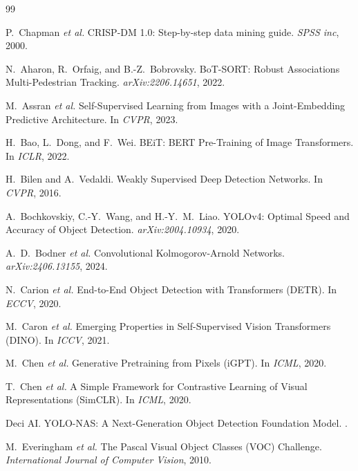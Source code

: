 
\begin{thebibliography}{99}

P.~Chapman \textit{et al.}
\newblock CRISP-DM 1.0: Step-by-step data mining guide.
\newblock \textit{SPSS inc}, 2000.

N.~Aharon, R.~Orfaig, and B.-Z.~Bobrovsky.
\newblock BoT-SORT: Robust Associations Multi-Pedestrian Tracking.
\newblock \textit{arXiv:2206.14651}, 2022.

M.~Assran \textit{et al.}
\newblock Self-Supervised Learning from Images with a Joint-Embedding Predictive Architecture.
\newblock In \textit{CVPR}, 2023.

H.~Bao, L.~Dong, and F.~Wei.
\newblock BEiT: BERT Pre-Training of Image Transformers.
\newblock In \textit{ICLR}, 2022.

H.~Bilen and A.~Vedaldi.
\newblock Weakly Supervised Deep Detection Networks.
\newblock In \textit{CVPR}, 2016.

A.~Bochkovskiy, C.-Y.~Wang, and H.-Y.~M.~Liao.
\newblock YOLOv4: Optimal Speed and Accuracy of Object Detection.
\newblock \textit{arXiv:2004.10934}, 2020.

A.~D.~Bodner \textit{et al.}
\newblock Convolutional Kolmogorov-Arnold Networks.
\newblock \textit{arXiv:2406.13155}, 2024.

N.~Carion \textit{et al.}
\newblock End-to-End Object Detection with Transformers (DETR).
\newblock In \textit{ECCV}, 2020.

M.~Caron \textit{et al.}
\newblock Emerging Properties in Self-Supervised Vision Transformers (DINO).
\newblock In \textit{ICCV}, 2021.

M.~Chen \textit{et al.}
\newblock Generative Pretraining from Pixels (iGPT).
\newblock In \textit{ICML}, 2020.

T.~Chen \textit{et al.}
\newblock A Simple Framework for Contrastive Learning of Visual Representations (SimCLR).
\newblock In \textit{ICML}, 2020.

Deci AI.
\newblock YOLO-NAS: A Next-Generation Object Detection Foundation Model.
.

M.~Everingham \textit{et al.}
\newblock The Pascal Visual Object Classes (VOC) Challenge.
\newblock \textit{International Journal of Computer Vision}, 2010.


\end{thebibliography}
